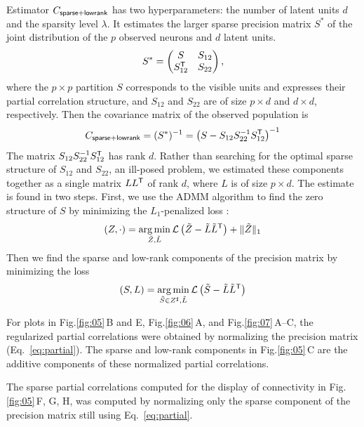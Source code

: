 \documentclass[10pt]{article}
\newcommand{\figref}[2]{Fig.\;\ref{fig:#1}\,#2}
\newcommand{\loss}[1]{\mathcal L\left(#1\right)}
\newcommand{\T}{{\sf T}}
\DeclareMathOperator*{\argmin}{arg\,min}
\begin{document}
Estimator $C_{\sf sparse+lowrank}$ has two hyperparameters: the number of latent units $d$ and the sparsity level $\lambda$. It estimates the larger sparse precision matrix $S^\ast$ of the joint distribution of the $p$ observed neurons and $d$ latent units.  
\begin{equation}
S^\ast=
\begin{pmatrix}
S & S_{12} \\
S_{12}^\T & S_{22}
\end{pmatrix},
\end{equation}
where the $p\times p$ partition $S$ corresponds to the visible units and expresses their partial correlation structure, and $S_{12}$ and $S_{22}$ are of size $p\times d$ and $d\times d$, respectively.
Then the covariance matrix of the observed population is 
\begin{equation}
C_{\sf sparse+lowrank} = (S^\ast)^{-1} = \left(S-S_{12}S_{22}^{-1}S_{12}^\T\right)^{-1}
\end{equation}
The matrix $ S_{12}S_{22}^{-1}S_{12}^\T$ has rank $d$. Rather than searching for the optimal sparse structure of $S_{12}$ and $S_{22}$, an ill-posed problem, we estimated these components together as a single matrix $LL^\T$ of rank $d$, where $L$ is of size $p\times d$.
The estimate is found in two steps. First, we use the ADMM algorithm to find the zero structure of $S$ by minimizing the $L_1$-penalized loss \cite{Chandrasekaran:2010,Ma:2013}:
\begin{equation}
(Z,\cdot) = \argmin\limits_{\tilde Z,\tilde L} \loss{\tilde Z-\tilde L\tilde L^\T} + \|\tilde Z\|_1
\end{equation}
Then we find the sparse and low-rank components of the precision matrix by minimizing the loss 
\begin{equation}
(S,L) = \argmin\limits_{\tilde S \in Z^\sharp,\tilde L} \loss{\tilde S-\tilde L \tilde L^\T}
\end{equation}

For plots in \figref{05}{B and E}, \figref{06}{A}, and \figref{07}{A--C}, the regularized partial correlations were obtained by normalizing the precision matrix (Eq.~\ref{eq:partial}). The sparse and low-rank components in \figref{05}{C} are the additive components of these normalized partial correlations. 

The sparse partial correlations computed for the display of connectivity in \figref{05}{F, G, H}, was computed by normalizing only the sparse component of the precision matrix still using Eq.~\ref{eq:partial}.
\end{document}
